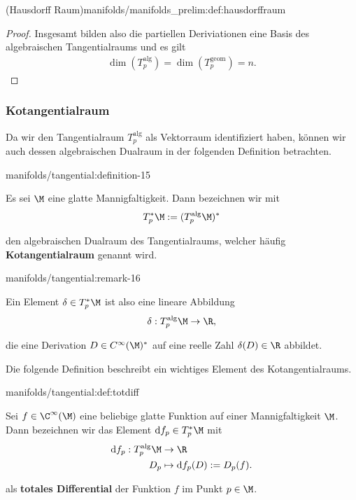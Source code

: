 \documentclass[letterpaper,10pt,english]{jupyterBook}
\begin{document}
\begin{definition}{(Hausdorff Raum)}{manifolds/manifolds_prelim:def:hausdorffraum}
\begin{proof}
\par
Insgesamt bilden also die partiellen Deriviationen eine Basis des algebraischen Tangentialraums und es gilt
\begin{align*}
\dim(T^{\text{alg}}_p)=\dim(T^{\text{geom}}_p)=n.
\end{align*}\end{proof}


\subsubsection{Kotangentialraum}
\label{\detokenize{manifolds/tangential:kotangentialraum}}
\par
Da wir den Tangentialraum \(T^{\text{alg}}_p\) als Vektorraum identifiziert haben, können wir auch dessen algebraischen Dualraum in der folgenden Definition betrachten.
\begin{definition}{}{manifolds/tangential:definition-15}



\par
Es sei \(\M\) eine glatte Mannigfaltigkeit.
Dann bezeichnen wir mit
\begin{align*}
T_p^\ast\M:= (T_p^{\text{alg}}\M)^\ast
\end{align*}
\par
den algebraischen Dualraum des Tangentialraums, welcher häufig \textbf{Kotangentialraum} genannt wird.
\end{definition}
\begin{remark}{}{manifolds/tangential:remark-16}



\par
Ein Element \(\delta\in T_p^\ast\M\) ist also eine lineare Abbildung
\begin{align*}
\delta: T_p^{\text{alg}}\M \to \R,
\end{align*}
\par
die eine Derivation \(D\in C^\infty(\M)^\ast\) auf eine reelle Zahl \(\delta(D)\in\R\) abbildet.
\end{remark}

\par
Die folgende Definition beschreibt ein wichtiges Element des Kotangentialraums.
\begin{definition}{}{manifolds/tangential:def:totdiff}



\par
Sei \(f\in\C^\infty(\M)\) eine beliebige glatte Funktion auf einer Mannigfaltigkeit \(\M\).
Dann bezeichnen wir das Element \(\mathrm{d}f_p \in T_p^\ast\M\) mit
\begin{align*}
\mathrm{d}f_p: T_p^{\text{alg}}\M &\to\R\\
D_p &\mapsto \mathrm{d}f_p(D):= D_p(f).
\end{align*}
\par
als \textbf{totales Differential} der Funktion \(f\) im Punkt \(p \in \M\).
\end{definition}


\end{definition}
\end{document}

